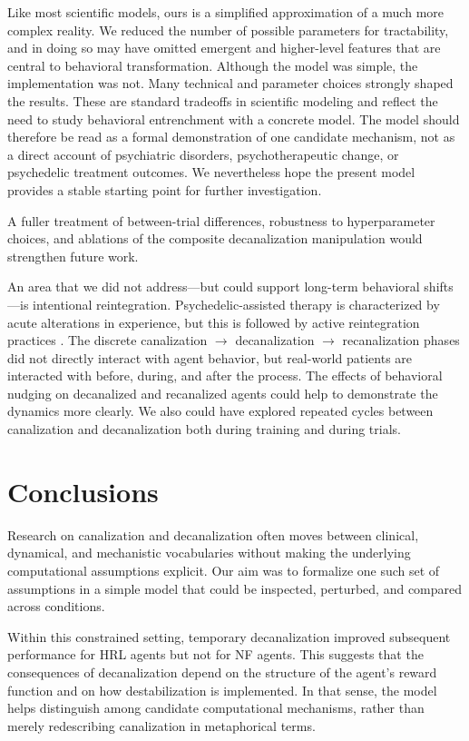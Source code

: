 Like most scientific models, ours is a simplified approximation of a much more complex reality. We reduced the number of possible parameters for tractability, and in doing so may have omitted emergent and higher-level features that are central to behavioral transformation. Although the model was simple, the implementation was not. Many technical and parameter choices strongly shaped the results. These are standard tradeoffs in scientific modeling and reflect the need to study behavioral entrenchment with a concrete model. The model should therefore be read as a formal demonstration of one candidate mechanism, not as a direct account of psychiatric disorders, psychotherapeutic change, or psychedelic treatment outcomes. We nevertheless hope the present model provides a stable starting point for further investigation.

A fuller treatment of between-trial differences, robustness to hyperparameter choices, and ablations of the composite decanalization manipulation would strengthen future work.

An area that we did not address—but could support long-term behavioral shifts—is intentional reintegration. Psychedelic-assisted therapy is characterized by acute alterations in experience, but this is followed by active reintegration practices \cite{bathje_psychedelic_2022}. The discrete canalization \(\rightarrow\) decanalization \(\rightarrow\) recanalization phases did not directly interact with agent behavior, but real-world patients are interacted with before, during, and after the process. The effects of behavioral nudging on decanalized and recanalized agents could help to demonstrate the dynamics more clearly. We also could have explored repeated cycles between canalization and decanalization both during training and during trials.


\section{Conclusions}

Research on canalization and decanalization often moves between clinical, dynamical, and mechanistic vocabularies without making the underlying computational assumptions explicit. Our aim was to formalize one such set of assumptions in a simple model that could be inspected, perturbed, and compared across conditions.

Within this constrained setting, temporary decanalization improved subsequent performance for HRL agents but not for NF agents. This suggests that the consequences of decanalization depend on the structure of the agent's reward function and on how destabilization is implemented. In that sense, the model helps distinguish among candidate computational mechanisms, rather than merely redescribing canalization in metaphorical terms.

